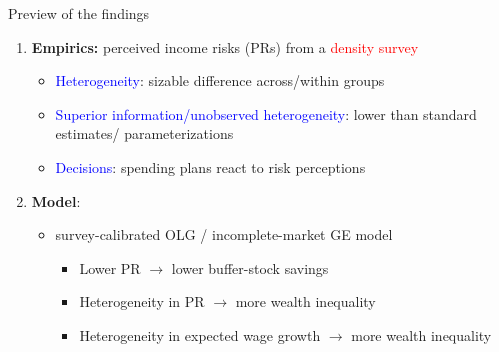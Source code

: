 \documentclass{beamer}
\begin{document}
\begin{frame}{Preview of the findings}
	\begin{enumerate}
		\item \textbf{Empirics:} perceived income risks (PRs) from a \textcolor{red}{density survey}
		\begin{itemize}
			\item \textcolor{blue}{Heterogeneity}: sizable difference across/within groups
			\item \textcolor{blue}{Superior information/unobserved heterogeneity}: lower than standard estimates/ parameterizations
			\item \textcolor{blue}{Decisions}: spending plans react to risk perceptions
			

		
		\end{itemize}
\pause
		\item \textbf{Model}: 
		\begin{itemize}
			\item survey-calibrated OLG / incomplete-market GE model 
\begin{itemize}
	\item Lower PR $\rightarrow$ lower buffer-stock savings 
	\item Heterogeneity in PR $\rightarrow$ more wealth inequality 
		\item Heterogeneity in expected wage growth $\rightarrow$ more wealth inequality 
\end{itemize}
		\end{itemize} 
	\end{enumerate}
\end{frame}
\end{document}
